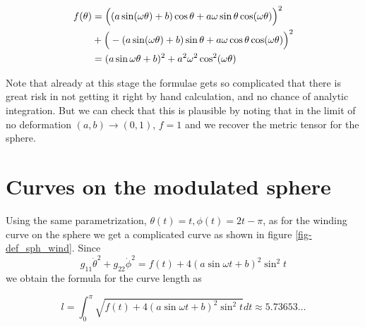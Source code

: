 \begin{align}
 f(\theta) & =   \Big((a\sin(\omega\theta)+b)\cos\theta +a\omega\sin\theta\cos(\omega\theta)\Big)^2  \notag\\ 
          & + \Big(-(a\sin(\omega\theta)+b)\sin\theta+a\omega\cos\theta\cos(\omega\theta)\Big)^2 \notag\\
          &= (a\sin\omega\theta + b)^2  + a^2\omega^2\cos^2(\omega\theta)\notag 
\end{align}

Note that already at this stage the formulae gets so complicated that there is great risk in not 
getting it right by hand calculation, and no chance of analytic integration. But we can check that 
this is plausible by noting that in the limit of no deformation $(a,b)\to (0,1)$, $f=1$ and we 
recover the metric tensor for the sphere.

\section{Curves on the modulated sphere}
Using the same parametrization, $\theta(t)=t, \phi(t)=2t-\pi$, as for the winding curve on the sphere we get a complicated curve as shown in figure \ref{fig-def_sph_wind}. Since
$$
   g_{11}\dot{\theta}^2 + g_{22}\dot{\phi}^2 = f(t) + 4(a\sin\omega t + b)^2\sin^2t
$$
we obtain the formula for the curve length as 

$$
   l = \int_0^\pi{\sqrt{ f(t) + 4(a\sin\omega t + b)^2\sin^2t }}dt \approx 5.73653\ldots
$$




